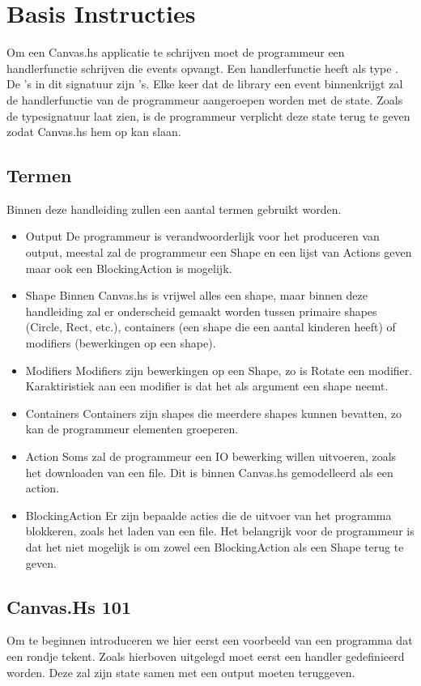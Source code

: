 \section{Basis Instructies}

Om een Canvas.hs applicatie te schrijven moet de programmeur een handlerfunctie schrijven die events opvangt. Een handlerfunctie heeft als type . De 's in dit signatuur zijn 's. Elke keer dat de library een event binnenkrijgt zal de handlerfunctie van de programmeur aangeroepen worden met de state. Zoals de typesignatuur laat zien, is de programmeur verplicht deze state terug te geven zodat Canvas.hs hem op kan slaan.

\subsection{Termen}
Binnen deze handleiding zullen een aantal termen gebruikt worden.
\begin{itemize}
	\item Output
De programmeur is verandwoorderlijk voor het produceren van output, meestal zal de programmeur een Shape en een lijst van Actions geven maar ook een BlockingAction is mogelijk.
	\item Shape
Binnen Canvas.hs is vrijwel alles een shape, maar binnen deze handleiding zal er onderscheid gemaakt worden tussen primaire shapes (Circle, Rect, etc.), containers (een shape die een aantal kinderen heeft) of modifiers (bewerkingen op een shape).
	\item Modifiers
Modifiers zijn bewerkingen op een Shape, zo is Rotate een modifier. Karaktiristiek aan een modifier is dat het als argument een shape neemt.
	\item Containers
Containers zijn shapes die meerdere shapes kunnen bevatten, zo kan de programmeur elementen groeperen.
	\item Action
Soms zal de programmeur een IO bewerking willen uitvoeren, zoals het downloaden van een file. Dit is binnen Canvas.hs gemodelleerd als een action.
	\item BlockingAction
Er zijn bepaalde acties die de uitvoer van het programma blokkeren, zoals het laden van een file. Het belangrijk voor de programmeur is dat het niet mogelijk is om zowel een BlockingAction als een Shape terug te geven. 
\end{itemize}

\subsection{Canvas.Hs 101}
Om te beginnen introduceren we hier eerst een voorbeeld van een programma dat een rondje tekent. Zoals hierboven uitgelegd moet eerst een handler gedefinieerd worden. Deze zal zijn state samen met een output moeten teruggeven.

